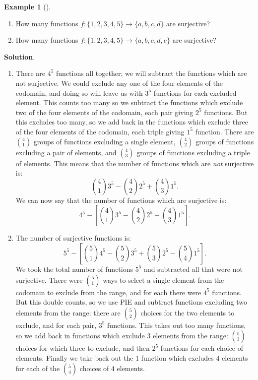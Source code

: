 \documentclass[10pt,]{book}
\theoremstyle{plain}
\theoremstyle{definition}
\theoremstyle{definition}
\newtheorem{example}[theorem]{Example}
\theoremstyle{definition}
\theoremstyle{definition}
\numberwithin{equation}{chapter}
\begin{document}
\begin{example}[]\label{example-19}
\hypertarget{p-899}{}%
\leavevmode%
\begin{enumerate}
\item\hypertarget{li-144}{}\hypertarget{p-900}{}%
How many functions \(f: \{1,2,3,4,5\} \to \{a,b,c,d\}\) are surjective?%
\item\hypertarget{li-145}{}\hypertarget{p-901}{}%
How many functions \(f: \{1,2,3,4,5\} \to \{a,b,c,d,e\}\) are surjective?%
\end{enumerate}
%
\par\smallskip%
\noindent\textbf{Solution}.\hypertarget{solution-84}{}\quad%
\hypertarget{p-902}{}%
\leavevmode%
\begin{enumerate}
\item\hypertarget{li-146}{}\hypertarget{p-903}{}%
There are \(4^5\) functions all together; we will subtract the functions which are not surjective.  We could exclude any one of the four elements of the codomain, and doing so will leave us with \(3^5\) functions for each excluded element.  This counts too many so we subtract the functions which exclude two of the four elements of the codomain, each pair giving \(2^5\) functions.  But this excludes too many, so we add back in the functions which exclude three of the four elements of the codomain, each triple giving \(1^5\) function.  There are \({4 \choose 1}\) groups of functions excluding a single element, \({4 \choose 2}\) groups of functions excluding a pair of elements, and \({4 \choose 3}\) groups of functions excluding a triple of elements.  This means that the number of functions which are \emph{not} surjective is:%
\begin{equation*}
{4 \choose 1}3^5 - {4 \choose 2}2^5 + {4 \choose 3}1^5.
\end{equation*}
We can now say that the number of functions which are surjective is:%
\begin{equation*}
4^5 - \left[{4 \choose 1}3^5 - {4 \choose 2}2^5 + {4 \choose 3}1^5\right].
\end{equation*}
%
\item\hypertarget{li-147}{}\hypertarget{p-904}{}%
The number of surjective functions is:%
\begin{equation*}
5^5 - \left[{5 \choose 1}4^5 - {5 \choose 2}3^5 + {5 \choose 3}2^5 - {5 \choose 4}1^5\right].
\end{equation*}
We took the total number of functions \(5^5\) and subtracted all that were not surjective.  There were \({5 \choose 1}\) ways to select a single element from the codomain to exclude from the range, and for each there were \(4^5\) functions.  But this double counts, so we use PIE and subtract functions excluding two elements from the range: there are \({5 \choose 2}\) choices for the two elements to exclude, and for each pair, \(3^5\) functions.  This takes out too many functions, so we add back in functions which exclude 3 elements from the range: \({5 \choose 3}\) choices for which three to exclude, and then \(2^5\) functions for each choice of elements.  Finally we take back out the 1 function which excludes 4 elements for each of the \({5 \choose 4}\) choices of 4 elements.%

\end{enumerate}
\end{example}
\end{document}
